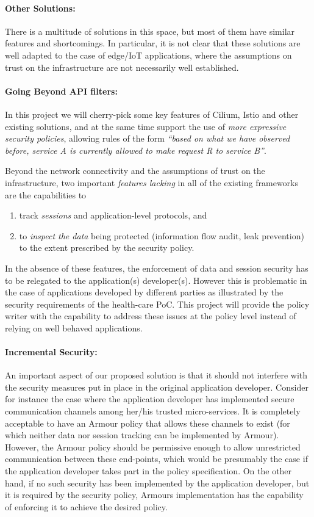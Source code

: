 \documentclass[a4paper]{article}
\newcommand{\armour}{{\sc Armour}}
\begin{document}
\paragraph{\sc Other Solutions:}
There is a multitude of solutions in this space, but most of them have
similar features and shortcomings.
%
In particular, it is not clear that these solutions are well adapted
to the case of edge/IoT applications, where the assumptions on trust
on the infrastructure are not necessarily well established. 

\paragraph{\sc Going Beyond API filters:}
In this project we will cherry-pick some key features of Cilium, Istio
and other existing solutions, and at the same time support the use of
\emph{more expressive security policies}, allowing rules of the form
\emph{“based on what we have observed before, service A is currently
  allowed to make request R to service B”}.

Beyond the network connectivity and the assumptions of trust on the
infrastructure, two important \emph{features lacking} in all of the
existing frameworks are the capabilities to
\begin{enumerate}
\item track \emph{sessions} and application-level protocols, and
\item to \emph{inspect the data} being protected (information flow audit,
  leak prevention) to the extent prescribed by the security policy.
\end{enumerate}
In the absence of these features, the enforcement of data and
session security has to be relegated to the application(s) developer(s).
%
However this is problematic in the case of applications developed by
different parties as illustrated by the security requirements of the
health-care PoC.
%
This project will provide the policy writer with the capability to
address these issues at the policy level instead of relying on well
behaved applications.

\paragraph{\sc Incremental Security:}
An important aspect of our proposed solution is that it should not
interfere with the security measures put in place in the original
application developer.
%
Consider for instance the case where the application developer has
implemented secure communication channels among her/his trusted
micro-services.
%
It is completely acceptable to have an \armour{} policy that allows
these channels to exist (for which neither data nor session tracking
can be implemented by \armour{}).
%
However, the \armour{} policy should be permissive enough to allow
unrestricted communication between these end-points, which would be
presumably the case if the application developer takes part in the
policy specification. 
%
On the other hand, if no such security has been implemented by the
application developer, but it is required by the security policy,
\armour{}s implementation has the capability of enforcing it to
achieve the desired policy.
\end{document}

